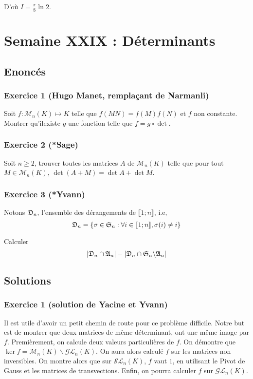 \documentclass{article}
\begin{document}
D'où $I = \frac{\pi}{8}\ln{2}$.
\section{Semaine XXIX : Déterminants}
\subsection*{Enoncés}
\subsubsection*{Exercice 1 (Hugo Manet, remplaçant de Narmanli)}
Soit $f : \mathcal{M}_n(K) \mapsto K$ telle que $f(MN)=f(M)f(N)$ et $f$ non constante. Montrer qu'ilexiste $g$ une fonction telle que $f = g\circ \det$.
\subsubsection*{Exercice 2 (*Sage)}
Soit $n\geq 2$, trouver toutes les matrices $A$ de $\mathcal{M}_n(K)$ telle que pour tout $M\in\mathcal{M}_n(K)$, $\det{(A+M)}=\det A + \det M$.
\subsubsection*{Exercice 3 (*Yvann)}
Notons $\frak{D}_n$, l'ensemble des dérangements de $\llbracket 1;n\rrbracket$, i.e, 
\begin{align*}
\frak{D}_n =\{\sigma\in\frak{S}_n : \forall i\in\llbracket 1;n\rrbracket, \sigma(i)\neq i\}
\end{align*}

Calculer 
\begin{align*}
|\frak{D}_n\cap \frak{A}_n|-|\frak{D}_n\cap \frak{S}_n\backslash\frak{A}_n|
\end{align*}


\subsection*{Solutions}
\subsubsection*{Exercice 1 (solution de Yacine et Yvann)}

Il est utile d'avoir un petit chemin de route pour ce problème difficile. Notre but est de montrer que deux matrices de même déterminant, ont une même image par $f$. Premièrement, on calcule deux valeurs particulières de $f$. On démontre que $\ker f = \mathcal{M}_n(K)\backslash \mathcal{G}\mathcal{L}_n(K)$. On aura alors calculé $f$ sur les matrices non inversibles. On montre alors que sur $\mathcal{S}\mathcal{L}_n(K)$, $f$ vaut $1$, en utilisant le Pivot de Gauss et les matrices de transvections. Enfin, on pourra calculer $f$ sur $\mathcal{G}\mathcal{L}_n(K)$.
\newline
\end{document}
